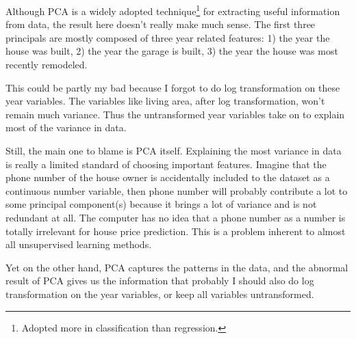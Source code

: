 \documentclass[a4paper]{article}
\begin{document}
Although PCA is a widely adopted technique\footnote{Adopted more in classification than regression.} for extracting useful information from data, the result here doesn't really make much sense. The first three principals are mostly composed of three year related features: 1) the year the house was built, 2) the year the garage is built, 3) the year the house was most recently remodeled. 

This could be partly my bad because I forgot to do log transformation on these year variables. The variables like living area, after log transformation, won't remain much variance. Thus the untransformed year variables take on to explain most of the variance in data.

Still, the main one to blame is PCA itself. Explaining the most variance in data is really a limited standard of choosing important features. Imagine that the phone number of the house owner is accidentally included to the dataset as a continuous number variable, then phone number will probably contribute a lot to some principal component(s) because it brings a lot of variance and is not redundant at all. The computer has no idea that a phone number as a number is totally irrelevant for house price prediction. This is a problem inherent to almost all unsupervised learning methods. 

Yet on the other hand, PCA captures the patterns in the data, and the abnormal result of PCA gives us the information that probably I should also do log transformation on the year variables, or keep all variables untransformed. 
\end{document}
